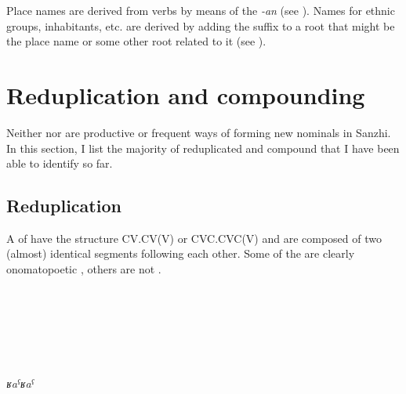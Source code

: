 Place names are derived from verbs by means of the  \textit{-an} (see ). Names for ethnic groups, inhabitants, etc. are derived by adding the suffix  to a root that might be the place name or some other root related to it (see ).


\section{Reduplication and compounding}
\label{sec:nounwordformation}
Neither  nor  are productive or frequent ways of forming new nominals in Sanzhi. In this section, I list the majority of reduplicated and compound  that I have been able to identify so far. 


\subsection{Reduplication}
\label{ssec:Reduplication}

A  of  have the structure CV.CV(V) or CVC.CVC(V) and are composed of two (almost) identical segments following each other. Some of the  are clearly onomatopoetic , others are not .
%
\begin{exe}

	\ex	\label{ex:qːaˁqːaˁshook2}
		\TabPositions{15em,12em}
		 		\tab		{}  \\
		 			\tab		{}  \\
		 		\tab		{}  \\
					\tab		{} 
	
	\ex	\label{ex:qːaˁqːaˁshook}
		\TabPositions{15em,12em}
		 			\tab		{} \\
		 		\tab		{} \\
		\textit{ʁaˁʁaˁ} 
	
\end{exe}


